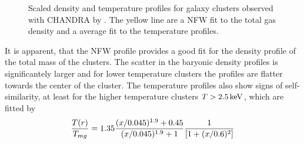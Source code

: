 \begin{figure}[tp]
	\centering
	\caption{Scaled density and temperature profiles for galaxy clusters
	observed with CHANDRA by \citep{Vikhlinin2006}. The yellow line are a NFW
	fit to the total gas density and a average fit to the temperature profiles.}
	\label{fig:profiles}
\end{figure}
It is apparent, that the NFW profile provides a good fit for the density
profile of the total mass of the clusters. The scatter in the baryonic density 
profiles is significantely larger and for lower temperature clusters the
profiles are flatter towards the center of the cluster. The temperature
profiles also show signs of self-similarity, at least for the higher
temperature clusters $T > \unit[2.5]{keV}$, which are fitted by
\begin{align}
\frac{T(r)}{T_{mg}} = 1.35 \frac{(x/0.045)^{1.9} + 0.45}{(x/0.045)^{1.9}+1}
\frac{1}{{ \left[ 1+(x/0.6)^2 \right] }} 
\end{align}
